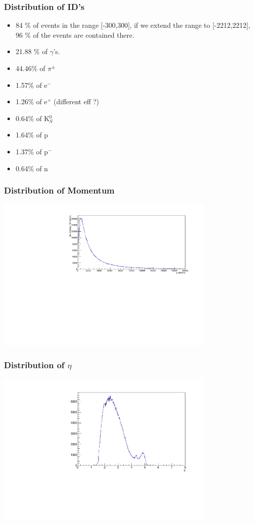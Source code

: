 \documentclass{beamer}
\begin{document}
\begin{frame}
\frametitle{Distribution of ID's}
\begin{itemize}
\item 84 \% of events in the range [-300,300], if we extend the range to [-2212,2212], 96 \% of the events are contained there. 
\item 21.88 \% of $\gamma$'s.
\item 44.46\% of $\pi^{\pm}$
\item 1.57\% of e$^{-}$
\item 1.26\% of e$^{+}$ (different eff ?)
\item 0.64\% of K$^0_S$
\item 1.64\% of p
\item 1.37\% of p$^{-}$
\item 0.64\% of n
\end{itemize}
\end{frame}

\begin{frame}
\frametitle{Distribution of Momentum}
\includegraphics[width=0.8\textwidth]{p.pdf}
\end{frame}

\begin{frame}
\frametitle{Distribution of $\eta$}
\includegraphics[width=0.8\textwidth]{eta.pdf}
\end{frame}
\end{document}
